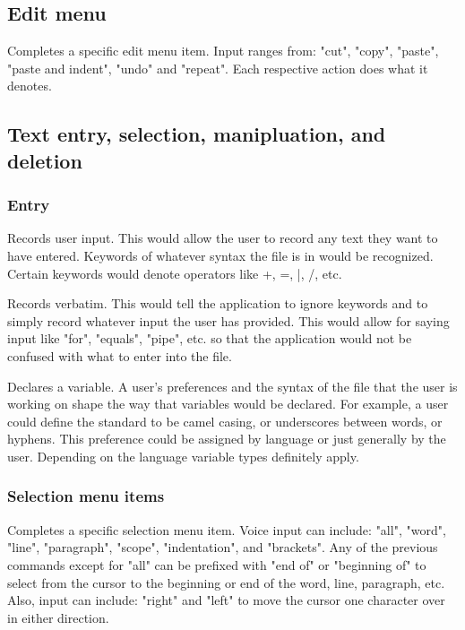 \documentclass[11pt, oneside]{article}
\newcounter{subsubsubsection}
\begin{document}
\subsection{Edit menu \hfill {}}

Completes a specific edit menu item. Input ranges from: "cut", "copy", "paste", "paste and indent",  "undo" and "repeat". Each respective action does what it denotes.

\subsection{Text entry, selection, manipluation, and deletion}

	\subsubsection{Entry}

		Records user input. This would allow the user to record any text they want to have entered. Keywords of whatever syntax the file is in would be recognized. Certain keywords would denote operators like +, =, |, /, etc. 

		Records verbatim. This would tell the application to ignore keywords and to simply record whatever input the user has provided. This would allow for saying input like "for", "equals", "pipe", etc. so that the application would not be confused with what to enter into the file.

		Declares a variable. A user's preferences and the syntax of the file that the user is working on shape the way that variables would be declared. For example, a user could define the standard to be camel casing, or underscores between words, or hyphens. This preference could be assigned by language or just generally by the user. Depending on the language variable types definitely apply.


	\subsubsection{Selection menu items \hfill {}}
	Completes a specific selection menu item. Voice input can include: "all", "word", "line", "paragraph", "scope", "indentation", and "brackets". Any of the previous commands except for "all" can be prefixed with "end of" or "beginning of" to select from the cursor to the beginning or end of the word, line, paragraph, etc. Also, input can include: "right" and "left" to move the cursor one character over in either direction.
\end{document}
